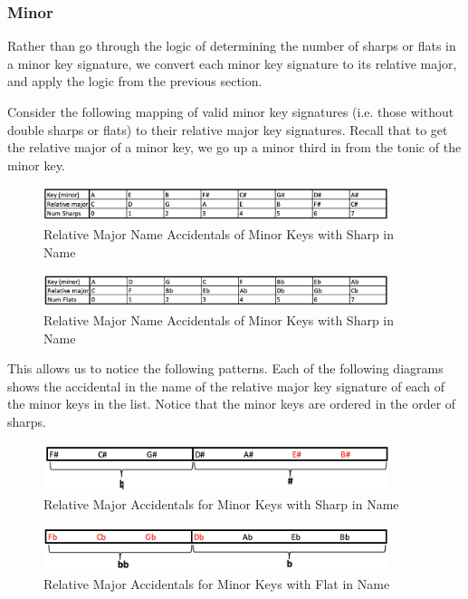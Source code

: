 \documentclass{report}
\begin{document}
\subsubsection{Minor}
Rather than go through the logic of determining the number of sharps or flats in a minor key signature, we convert each minor key signature to its relative major, and apply the logic from the previous section.

Consider the following mapping of valid minor key signatures (i.e. those without double sharps or flats) to their relative major key signatures. Recall that to get the relative major of a minor key, we go up a minor third in from the tonic of the minor key. 

\begin{figure}[h!]
\centering
\includegraphics[width=0.9\textwidth]{images/minor_sharp}
\caption{Relative Major Name Accidentals of Minor Keys with Sharp in Name}
\label{minor_sharp}
\end{figure}


\begin{figure}[h!]
\centering
\includegraphics[width=0.9\textwidth]{images/minor_flat}
\caption{Relative Major Name Accidentals of Minor Keys with Sharp in Name}
\label{minor_flat}
\end{figure}
\newpage

This allows us to notice the following patterns. Each of the following diagrams shows the accidental in the name of the relative major key signature of each of the minor keys in the list. Notice that the minor keys are ordered in the order of sharps. 

\begin{figure}[h!]
\centering
\includegraphics[width=0.9\textwidth]{images/sharp_min_to_maj}
\caption{Relative Major Accidentals for Minor Keys with Sharp in Name}
\label{major_sharp}
\end{figure}

\begin{figure}[h!]
\centering
\includegraphics[width=0.9\textwidth]{images/flat_min_to_maj}
\caption{Relative Major Accidentals for Minor Keys with Flat in Name}
\label{major_flat}
\end{figure}
\end{document}
